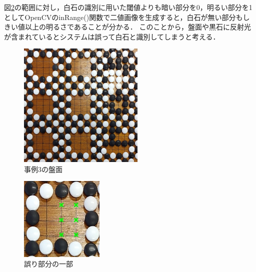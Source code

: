 \documentclass[openright]{nitocs}
\numberwithin{equation}{section}
\begin{document}
                図\ref{ex3_error}の範囲に対し，白石の識別に用いた閾値よりも暗い部分を0，明るい部分を1としてOpenCVのinRange()関数で二値画像を生成すると，白石が無い部分もしきい値以上の明るさであることが分かる．
                このことから，盤面や黒石に反射光が含まれているとシステムは誤って白石と識別してしまうと考える．
                \begin{figure}[tb] %
                    \begin{center}
                    \includegraphics[clip,width=60mm]{DSC_0098/boardImg.jpg} 
                    \caption{事例3の盤面}
                    \label{ex3}
                    \end{center}
                \end{figure}

                \begin{figure}[tb] %
                    \begin{center}
                    \includegraphics[clip,width=40mm]{DSC_0098/TRIM_resultCompare.jpg} 
                    \caption{誤り部分の一部}
                    \label{ex3_error}
                    \end{center}
                \end{figure}
\end{document}
